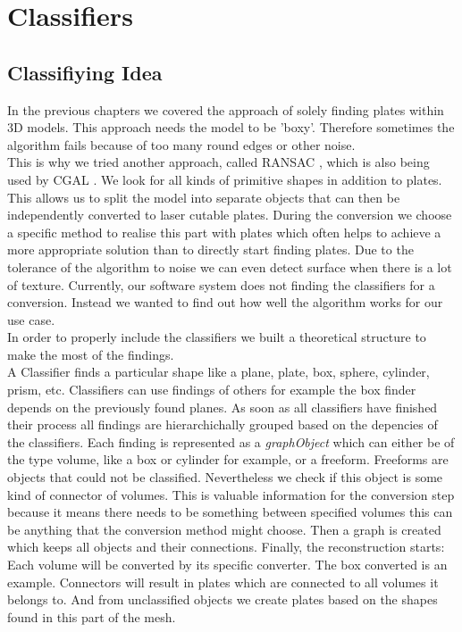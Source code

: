 \documentclass[../ClassicThesis.tex]{subfiles}
\begin{document}
\chapter{Classifiers}\label{ch:classifiers}
\newcommand{\TODO}[1]{\textcolor{red}{\\ \textbf{TODO:} #1 \\}}

\section{Classifiying Idea}
\cite{positionVectorRetrieval}
In the previous chapters we covered the approach of solely finding plates within 3D models. This approach needs the model to be 'boxy'. Therefore sometimes the algorithm fails because of too many round edges or other noise. \\
This is why we tried another approach, called RANSAC \cite{ransac}, which is also being used by CGAL \cite{cgal}. We look for all kinds of primitive shapes in addition to plates. This allows us to split the model into separate objects that can then be independently converted to laser cutable plates. During the conversion we choose a specific method to realise this part with plates which often helps to achieve a more appropriate solution than to directly start finding plates. Due to the tolerance of the algorithm to noise we can even detect surface when there is a lot of texture.
Currently, our software system does not finding the classifiers for a conversion. Instead we wanted to find out how well the algorithm works for our use case. \\
In order to properly include the classifiers we built a theoretical structure to make the most of the findings. \\
A Classifier finds a particular shape like a plane, plate, box, sphere, cylinder, prism, etc. Classifiers can use findings of others for example the box finder depends on the previously found planes. As soon as all classifiers have finished their process all findings are hierarchichally grouped based on the depencies of the classifiers. Each finding is represented as a \emph{graphObject} which can either be of the type volume, like a box or cylinder for example, or a freeform. Freeforms are objects that could not be classified. Nevertheless we check if this object is some kind of connector of volumes. This is valuable information for the conversion step because it means there needs to be something between specified volumes this can be anything that the conversion method might choose. Then a graph is created which keeps all objects and their connections. Finally, the reconstruction starts: Each volume will be converted by its specific converter. The box converted is an example. Connectors will result in plates which are connected to all volumes it belongs to. And from  unclassified objects we create plates based on the shapes found in this part of the mesh. \\
\end{document}
